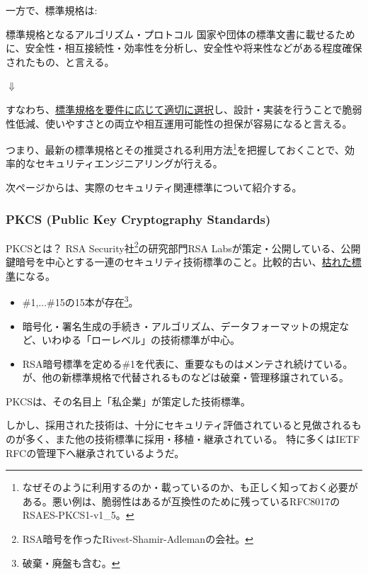 \documentclass[12pt,dvipdfmx]{beamer}
\begin{document}
\begin{frame}
一方で、標準規格は:
\begin{block}{標準規格となるアルゴリズム・プロトコル}
国家や団体の標準文書に載せるために、\alert{安全性・相互接続性・効率性を分析し、安全性や将来性などがある程度確保}されたもの、と言える。
\end{block}

\begin{center}
 $\Downarrow$
\end{center}

すなわち、\underline{標準規格を要件に応じて適切に選択}し、設計・実装を行うことで脆弱性低減、使いやすさとの両立や相互運用可能性の担保が容易になると言える。

\vspace{1ex}

つまり、最新の標準規格とその推奨される利用方法\footnote[frame]{\scriptsize なぜそのように利用するのか・載っているのか、も正しく知っておく必要がある。悪い例は、脆弱性はあるが互換性のために残っているRFC8017のRSAES-PKCS1-v1\_5。}を把握しておくことで、\alert{効率的なセキュリティエンジニアリングが行える}。
\end{frame}

\begin{frame}
 次ページからは、実際のセキュリティ関連標準について紹介する。
\end{frame}


\begin{frame}
\frametitle{PKCS (Public Key Cryptography Standards)}
\begin{block}{PKCSとは？}
RSA Security社\footnote[frame]{\scriptsize RSA暗号を作ったRivest-Shamir-Adlemanの会社。}の研究部門RSA Labsが策定・公開している、公開鍵暗号を中心とする一連のセキュリティ技術標準のこと。比較的古い、\underline{枯れた標準}になる。
\end{block}
\begin{itemize}
 \item \#1,...\#15の15本が存在\footnote[frame]{\scriptsize 破棄・廃盤も含む。}。
 \item 暗号化・署名生成の手続き・アルゴリズム、データフォーマットの規定など、いわゆる「ローレベル」の技術標準が中心。
 \item RSA暗号標準を定める\#1を代表に、重要なものはメンテされ続けている。が、他の新標準規格で代替されるものなどは破棄・管理移譲されている。
\end{itemize}
\end{frame}

\begin{frame}
PKCSは、その名目上「私企業」が策定した技術標準。

しかし、採用された技術は、十分にセキュリティ評価されていると見做されるものが多く、また他の技術標準に採用・移植・継承されている。
特に多くはIETF RFCの管理下へ継承されているようだ。
\end{frame}
\end{document}
